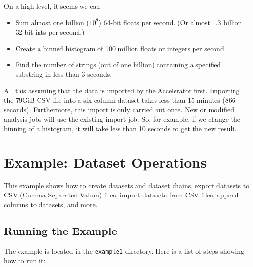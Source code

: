 \documentclass[a4paper]{article}
\begin{document}
On a high level, it seems we can
\begin{itemize}
\item Sum almost one billion ($10^9$) 64-bit floats per second.  (Or
  almost 1.3 billion 32-bit ints per second.)
\item Create a binned histogram of 100 million floats or integers per
  second.
\item Find the number of strings (out of one billion) containing a
  specified substring in less than 3 seconds.
\end{itemize}
All this assuming that the data is imported by the Accelerator first.
Importing the 79GiB CSV file into a six column dataset takes less than
15 minutes (866 seconds).  Furthermore, this import is only carried
out once.  New or modified analysis jobs will use the existing import
job.  So, for example, if we change the binning of a histogram, it
will take less than 10 seconds to get the new result.



\clearpage
\section*{Example:  Dataset Operations}

This example shows how to create datasets and dataset chains, export
datasets to CSV (Comma Separated Values) files, import datasets from
CSV-files, append columns to datasets, and more.

\subsection*{Running the Example}
The example is located in the \texttt{example1} directory.  Here is a
list of steps showing how to run it:
\end{document}
